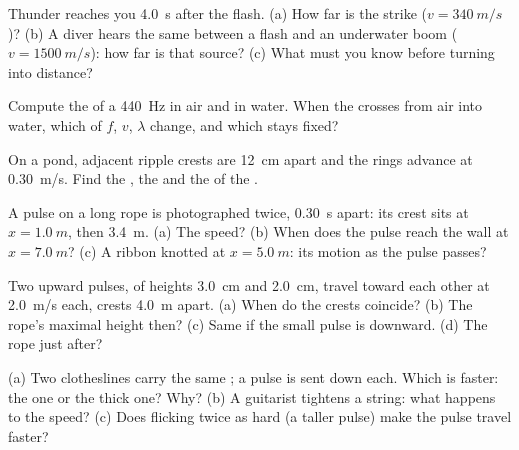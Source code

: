 \begin{exercise}[$\star$]\label{exo:g12:mechanical-waves:3}
Thunder reaches you \qty{4.0}{s} after the flash. (a) How far is the
strike ($v = \qty{340}{m/s}$)? (b) A diver hears the same  between
a flash and an underwater boom ($v = \qty{1500}{m/s}$): how far is that
source? (c) What must you know before turning  into distance?
\end{exercise}

\begin{exercise}[$\star$]\label{exo:g12:mechanical-waves:4}
Compute the  of a \qty{440}{Hz}  in air and in water.
When the  crosses from air into water, which of $f$, $v$,
$\lambda$ change, and which stays fixed?
\end{exercise}

\begin{exercise}[$\star$]\label{exo:g12:mechanical-waves:5}
On a pond, adjacent ripple crests are \qty{12}{cm} apart and the rings
advance at \qty{0.30}{m/s}. Find the , the  and the
 of the .
\end{exercise}

\begin{exercise}[$\star\star$]\label{exo:g12:mechanical-waves:6}
A pulse on a long rope is photographed twice, \qty{0.30}{s} apart: its
crest sits at $x = \qty{1.0}{m}$, then \qty{3.4}{m}. (a) The speed?
(b) When does the pulse reach the wall at $x = \qty{7.0}{m}$? (c) A
ribbon knotted at $x = \qty{5.0}{m}$: its motion as the pulse passes?
\end{exercise}

\begin{exercise}[$\star\star$]\label{exo:g12:mechanical-waves:7}
Two upward pulses, of heights \qty{3.0}{cm} and \qty{2.0}{cm}, travel
toward each other at \qty{2.0}{m/s} each, crests \qty{4.0}{m} apart.
(a) When do the crests coincide? (b) The rope's maximal height then?
(c) Same if the small pulse is downward. (d) The rope just after?
\end{exercise}

\begin{exercise}[$\star\star$]\label{exo:g12:mechanical-waves:8}
(a) Two clotheslines carry the same ; a pulse is sent down
each. Which is faster: the  one or the thick one? Why? (b) A
guitarist tightens a string: what happens to the  speed? (c) Does
flicking twice as hard (a taller pulse) make the pulse travel faster?
\end{exercise}

